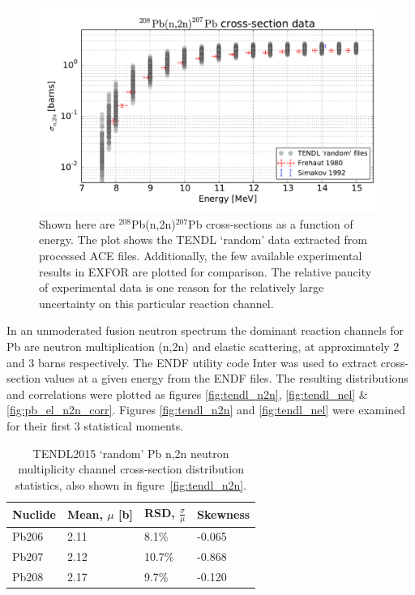 \begin{figure}[H]
  \centering
  \includegraphics[width=\textwidth]{pb208_n2n_tendl_exfor}
  \caption{Shown here are $^{208}$Pb(n,2n)$^{207}$Pb cross-sections as a function of energy. The plot shows the TENDL `random' data extracted from processed ACE files. Additionally, the few available experimental results in EXFOR are plotted for comparison. The relative paucity of experimental data is one reason for the relatively large uncertainty on this particular reaction channel.}
  \label{fig:tendl_lead}
\end{figure}

In an unmoderated fusion neutron spectrum the dominant reaction channels for Pb are neutron multiplication (n,2n) and elastic scattering, at approximately 2 and 3 barns respectively. The ENDF utility code Inter was used to extract cross-section values at a given energy from the ENDF files. The resulting distributions and correlations were plotted as figures \ref{fig:tendl_n2n}, \ref{fig:tendl_nel} \& \ref{fig:pb_el_n2n_corr}. Figures \ref{fig:tendl_n2n} and \ref{fig:tendl_nel} were examined for their first 3 statistical moments. 

\begin{table}[H]
  \footnotesize
  \centering 
  \begin{tabular}{llll}
    \toprule
    Nuclide & Mean, $\mu$ [b] & RSD, $\frac{\sigma}{\mu}$ & Skewness \\
    \midrule
    Pb206 & 2.11 & 8.1\% & -0.065 \\
    Pb207 & 2.12 & 10.7\% & -0.868 \\
    Pb208 & 2.17 & 9.7\% & -0.120 \\
    \bottomrule
  \end{tabular}
  \caption{TENDL2015 `random' Pb n,2n neutron multiplicity channel cross-section distribution statistics, also shown in figure~\ref{fig:tendl_n2n}.}
  \label{table:n2n}
\end{table}

